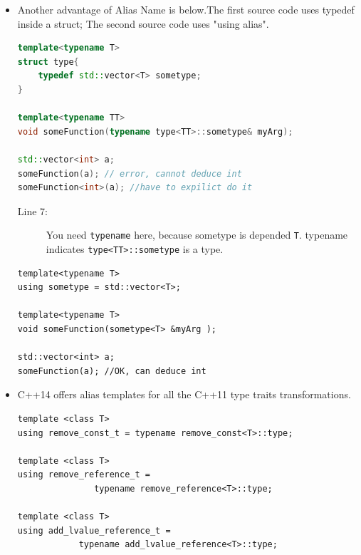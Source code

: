 \documentclass[a4paper,11pt,twoside]{book}
\begin{document}
\begin{itemize}
\item Another advantage of Alias Name is below.The first source code uses typedef inside a struct; The second source code uses "using alias".

\begin{lstlisting}[frame=single, language=c++]
template<typename T>
struct type{ 
	typedef std::vector<T> sometype; 
}

template<typename TT>
void someFunction(typename type<TT>::sometype& myArg);

std::vector<int> a;
someFunction(a); // error, cannot deduce int
someFunction<int>(a); //have to expilict do it 
\end{lstlisting}
\begin{description}
	\item[Line 7:] You need \texttt{typename} here, because sometype is depended \texttt{T}. \newline typename indicates \texttt{type<TT>::sometype} is a type.
\end{description}

\begin{lstlisting}[numbers=none]
template<typename T>
using sometype = std::vector<T>;

template<typename T>
void someFunction(sometype<T> &myArg );

std::vector<int> a;
someFunction(a); //OK, can deduce int
\end{lstlisting}


\item C++14 offers alias templates for all the C++11 type traits transformations.
\begin{lstlisting}[numbers=none]
template <class T>
using remove_const_t = typename remove_const<T>::type;

template <class T>
using remove_reference_t = 
               typename remove_reference<T>::type;

template <class T>
using add_lvalue_reference_t = 
            typename add_lvalue_reference<T>::type;
\end{lstlisting}

\end{itemize}
\end{document}
